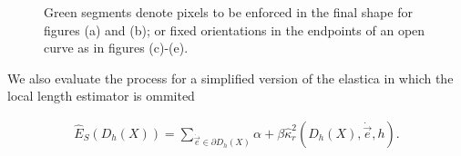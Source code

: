 \begin{figure}[h!]
{}\hspace{1em}%
\hspace{1em}%
\hspace{1em}%

\caption{Green segments denote pixels to be enforced in the final shape for figures (a) and (b); or fixed orientations in the endpoints of an open curve as in figures (c)-(e). }
\label{fig:fixed-pixels-evolution}
\end{figure}

We also evaluate the process for a simplified version of the elastica in which the local length estimator is ommited

	\begin{align}
	\hat{E}_S( D_h(X) ) = \sum_{\dot{\vec{e}} \in \partial D_h(X)}{ \alpha + \beta \hat{\kappa}_{r}^2(D_h(X),\dot{\vec{e}},h) }.
	\label{eq:simplified-digital-elastica}
	\end{align}
	

